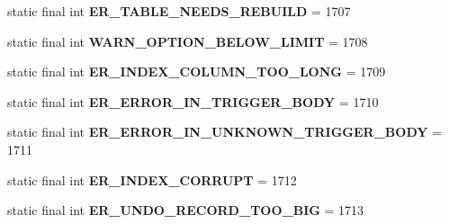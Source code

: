 \begin{DoxyCompactItemize}
static final int {\bfseries E\+R\+\_\+\+T\+A\+B\+L\+E\+\_\+\+N\+E\+E\+D\+S\+\_\+\+R\+E\+B\+U\+I\+LD} = 1707
\item 
\mbox{\label{classcom_1_1mysql_1_1cj_1_1exceptions_1_1_mysql_error_numbers_a78d038d7e2f65513f45f41e6486c75ba}} 
static final int {\bfseries W\+A\+R\+N\+\_\+\+O\+P\+T\+I\+O\+N\+\_\+\+B\+E\+L\+O\+W\+\_\+\+L\+I\+M\+IT} = 1708
\item 
\mbox{\label{classcom_1_1mysql_1_1cj_1_1exceptions_1_1_mysql_error_numbers_ae6a3115733036d3797ae32da5b2db27f}} 
static final int {\bfseries E\+R\+\_\+\+I\+N\+D\+E\+X\+\_\+\+C\+O\+L\+U\+M\+N\+\_\+\+T\+O\+O\+\_\+\+L\+O\+NG} = 1709
\item 
\mbox{\label{classcom_1_1mysql_1_1cj_1_1exceptions_1_1_mysql_error_numbers_a4a513add17f20a2725e52811d0a80b12}} 
static final int {\bfseries E\+R\+\_\+\+E\+R\+R\+O\+R\+\_\+\+I\+N\+\_\+\+T\+R\+I\+G\+G\+E\+R\+\_\+\+B\+O\+DY} = 1710
\item 
\mbox{\label{classcom_1_1mysql_1_1cj_1_1exceptions_1_1_mysql_error_numbers_ae513de8b97bc7f2129db1cebe4f3cb84}} 
static final int {\bfseries E\+R\+\_\+\+E\+R\+R\+O\+R\+\_\+\+I\+N\+\_\+\+U\+N\+K\+N\+O\+W\+N\+\_\+\+T\+R\+I\+G\+G\+E\+R\+\_\+\+B\+O\+DY} = 1711
\item 
\mbox{\label{classcom_1_1mysql_1_1cj_1_1exceptions_1_1_mysql_error_numbers_ac6aabfff4bf3cd640aaaf294dea601f0}} 
static final int {\bfseries E\+R\+\_\+\+I\+N\+D\+E\+X\+\_\+\+C\+O\+R\+R\+U\+PT} = 1712
\item 
\mbox{\label{classcom_1_1mysql_1_1cj_1_1exceptions_1_1_mysql_error_numbers_a36c1c72915ab0dc84d6ef0c3ecd22666}} 
static final int {\bfseries E\+R\+\_\+\+U\+N\+D\+O\+\_\+\+R\+E\+C\+O\+R\+D\+\_\+\+T\+O\+O\+\_\+\+B\+IG} = 1713
\item 
\mbox{\label{classcom_1_1mysql_1_1cj_1_1exceptions_1_1_mysql_error_numbers_a4fdab7dd68831b4083ffe5367cb8f5d3}} 

\end{DoxyCompactItemize}

